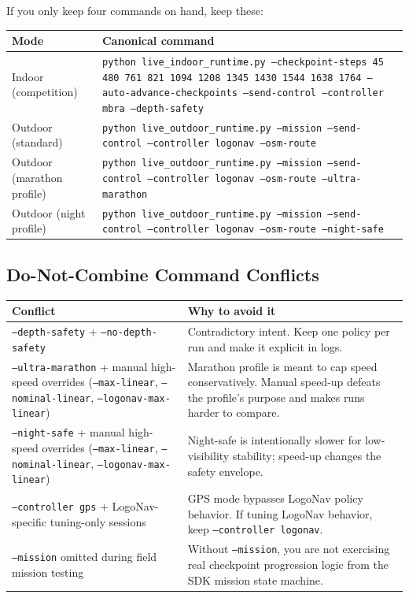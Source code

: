 \documentclass[11pt]{article}
\begin{document}
If you only keep four commands on hand, keep these:

\begin{center}
\begin{tabular}{p{}p{}}
\toprule
\textbf{Mode} & \textbf{Canonical command} \\
\midrule
Indoor (competition) &
\texttt{python live\_indoor\_runtime.py --checkpoint-steps 45 480 761 821 1094 1208 1345 1430 1544 1638 1764 --auto-advance-checkpoints --send-control --controller mbra --depth-safety} \\
Outdoor (standard) &
\texttt{python live\_outdoor\_runtime.py --mission --send-control --controller logonav --osm-route} \\
Outdoor (marathon profile) &
\texttt{python live\_outdoor\_runtime.py --mission --send-control --controller logonav --osm-route --ultra-marathon} \\
Outdoor (night profile) &
\texttt{python live\_outdoor\_runtime.py --mission --send-control --controller logonav --osm-route --night-safe} \\
\bottomrule
\end{tabular}
\end{center}

\subsection{Do-Not-Combine Command Conflicts}

\begin{longtable}{p{}p{}}
\toprule
\textbf{Conflict} & \textbf{Why to avoid it} \\
\midrule
\texttt{--depth-safety} + \texttt{--no-depth-safety} & Contradictory intent. Keep one policy per run and make it explicit in logs. \\
\texttt{--ultra-marathon} + manual high-speed overrides (\texttt{--max-linear}, \texttt{--nominal-linear}, \texttt{--logonav-max-linear}) & Marathon profile is meant to cap speed conservatively. Manual speed-up defeats the profile's purpose and makes runs harder to compare. \\
\texttt{--night-safe} + manual high-speed overrides (\texttt{--max-linear}, \texttt{--nominal-linear}, \texttt{--logonav-max-linear}) & Night-safe is intentionally slower for low-visibility stability; speed-up changes the safety envelope. \\
\texttt{--controller gps} + LogoNav-specific tuning-only sessions & GPS mode bypasses LogoNav policy behavior. If tuning LogoNav behavior, keep \texttt{--controller logonav}. \\
\texttt{--mission} omitted during field mission testing & Without \texttt{--mission}, you are not exercising real checkpoint progression logic from the SDK mission state machine. \\
\bottomrule
\end{longtable}
\end{document}

